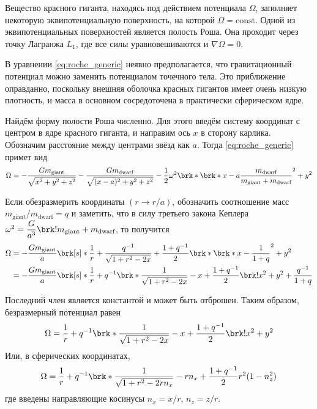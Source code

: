 Вещество красного гиганта, находясь под действием потенциала $\Omega$, заполняет некоторую эквипотенциальную поверхность, на которой $\Omega = \text{const}$. Одной из эквипотенциальных поверхностей является полость Роша. Она проходит через точку Лагранжа $L_1$, где все силы уравновешиваются и $\nabla \Omega = 0$.

В уравнении \eqref{eq:roche_generic} неявно предполагается, что гравитационный потенциал можно заменить потенциалом точечного тела. Это приближение оправданно, поскольку внешняя оболочка красных гигантов имеет очень низкую плотность, и масса в основном сосредоточена в практически сферическом ядре.

Найдём форму полости Роша численно. Для этого введём систему координат с центром в ядре красного гиганта, и направим ось $x$ в сторону карлика. Обозначим расстояние между центрами звёзд как $a$. Тогда \eqref{eq:roche_generic} примет вид
\[
\Omega =
-\frac{G m_\text{giant}}{\sqrt{x^2 + y^2 + z^2}}
-\frac{G m_\text{dwarf}}{\sqrt{(x - a)^2 + y^2 + z^2}}
-\frac{1}{2} \omega^2 \brk*{\brk*{x - a \frac{m_\text{dwarf}}{m_\text{giant} + m_\text{dwarf}}}^2 + y^2}
\]

Если обезразмерить координаты $(r \to r / a)$, обозначить соотношение масс $m_\text{giant} / m_\text{dwarf} = q$ и заметить, что в силу третьего закона Кеплера $\omega^2 = \dfrac{G}{a^3} \brk!{m_\text{giant} + m_\text{dwarf}}$, то получится
\begin{align*}
\Omega 
&= - \frac{G m_\text{giant}}{a} \brk[s]*{
    \frac{1}{r}
    + \frac{q^{-1}}{\sqrt{1 + r^2 - 2x}}
    + \frac{1 + q^{-1}}{2} \brk*{\brk*{x - \frac{1}{1+q}}^2 + y^2}
} \\
&= - \frac{G m_\text{giant}}{a} \brk[s]*{
    \frac{1}{r}
    + q^{-1} \brk*{
        \frac{1}{\sqrt{1 + r^2 - 2x}} - x
    }
    + \frac{1 + q^{-1}}{2} \brk!{x^2 + y^2}
    + \frac{q^{-1}}{1 + q}
}
\end{align*}

Последний член является константой и может быть отброшен. Таким образом, безразмерный потенциал равен
\begin{equation}
\Omega = \frac{1}{r} + q^{-1} \brk*{
    \frac{1}{\sqrt{1 + r^2 - 2x}} - x
}
+ \frac{1 + q^{-1}}{2} \brk!{x^2 + y^2}
\label{eq:roche_dekart}
\end{equation}
Или, в сферических координатах,
\begin{equation}
\Omega = \frac{1}{r} + q^{-1} \brk*{
    \frac{1}{\sqrt{1 + r^2 - 2r n_x}} - r n_x
}
+ \frac{1 + q^{-1}}{2} r^2 (1 - n_z^2)
\label{eq:roche_spherical}
\end{equation}
где введены направляющие косинусы $n_x = x / r$, $n_z = z / r$.

